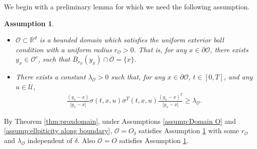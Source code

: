 \documentclass[amscd,amssymb,11pt]{article}
\newtheorem{assumption}[theorem]{Assumption}
\numberwithin{theorem}{section}
\numberwithin{equation}{section}
\begin{document}
We begin with a preliminary lemma for which we need the following assumption.
\begin{assumption}\label{assump:Domain O exterior}
\begin{itemize}
\item [(i)] $\mathscr{O}\subset\mathbb{R}^{d}$ is a bounded domain which satisfies the uniform exterior ball condition with a uniform radius $r_{\mathscr{O}}>0$. That is, for any $x\in\partial \mathscr{O}$, there exists $y_{x}\in \mathscr{O}^{c}$, such that $\overline{B}_{r_{\mathscr{O}}}(y_{x})\cap\overline{\mathscr{O}}=\{x\}$.
\item [(ii)] There exists a constant $\lambda_{\mathscr{O}}>0$ such that, for any $x\in\partial \mathscr{O}$, $t\in[0,T]$, and any $u\in\mathcal{U}$,
    \begin{align*}
    \frac{(y_{x}-x)}{|y_{x}-x|}\sigma(t,x,u)\sigma^{T}(t,x,u)\frac{(y_{x}-x)^{T}}{|y_{x}-x|}\geq \lambda_{\mathscr{O}}.
    \end{align*}
\end{itemize}
\end{assumption}

By Theorem \ref{thm:proxdomain}, under Assumptions \ref{assump:Domain O} and \ref{assump:ellpiticity along boundary}, $\mathscr{O}=O_{\delta}$ satisfies Assumption \ref{assump:Domain O exterior} with some $r_{\mathscr{O}}$ and $\lambda_{\mathscr{O}}$ independent of $\delta$. Also $\mathscr{O}=O$ satisfies Assumption \ref{assump:Domain O exterior}.
\end{document}
